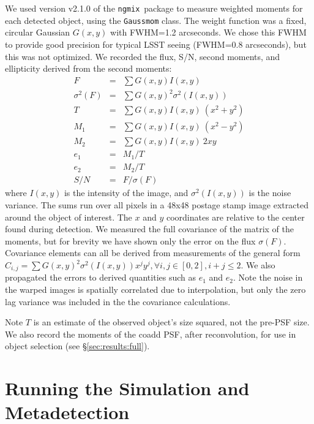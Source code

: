 \documentclass[twocolumn,twocolappendix,astrosym]{openjournal}
\newcommand{\ngmix}{\texttt{ngmix}}
\begin{document}
We used version v2.1.0 of the \ngmix\ package to measure weighted moments for
each detected object, using the \texttt{Gaussmom} class. The weight function
was a fixed, circular Gaussian $G(x, y)$ with FWHM=1.2 arcseconds. We chose
this FWHM to provide good precision for typical LSST seeing (FWHM=0.8
arcseconds), but this was not optimized.  We recorded the flux, S/N, second
moments, and ellipticity derived from the second moments:
\begin{eqnarray} \label{eq:moments}
    F &=& \sum G(x, y) I(x, y) \nonumber \\
    \sigma^2(F) &=& \sum G(x, y)^2 \sigma^2(I(x, y)) \nonumber \\
    T &=& \sum G(x, y) I(x, y) ~ (x^2 + y^2) \nonumber \\
    M_1 &=& \sum G(x, y) I(x, y) ~ (x^2 - y^2) \\
    M_2 &=& \sum G(x, y) I(x, y) ~ 2 x y \nonumber \\
    e_1 &=& M_1 / T \nonumber \\
    e_2 &=& M_2 / T \nonumber \\
    S/N &=& F / \sigma(F) \nonumber
\end{eqnarray}
where $I(x, y)$ is the intensity of the image, and $\sigma^2(I(x, y))$ is the
noise variance. The sums run over all pixels in a 48x48 postage stamp image
extracted around the object of interest.  The $x$ and $y$ coordinates are
relative to the center found during detection. We measured
the full covariance of the matrix of the moments, but for brevity we have shown only
the error on the flux $\sigma(F)$. Covariance elements 
can all be derived from measurements of the general form
$C_{i, j} = \sum G(x, y)^2 \sigma^2(I(x, y)) x^j y^j, \forall i, j \in [0, 2], i + j \le 2$.
We also propagated the errors to derived quantities such as $e_1$ and $e_2$.
Note the noise in the warped images is spatially correlated
due to interpolation, but only the zero lag variance was included in the
the covariance calculations.

Note $T$ is an estimate of the observed object's size squared, not the
pre-PSF size.  We also record the moments of the coadd PSF, after
reconvolution, for use in object selection (see \S \ref{sec:results:full}).

\section{Running the Simulation and Metadetection} \label{sec:running}
\end{document}
